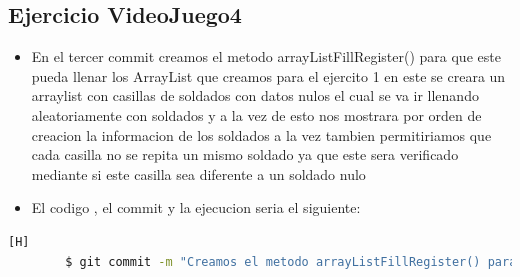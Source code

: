 \documentclass{article}
\begin{document}
	\subsection{Ejercicio VideoJuego4}
	\begin{itemize}	
		\item En el tercer commit creamos el metodo arrayListFillRegister() para que este pueda llenar los ArrayList que creamos para el ejercito 1 en este se creara un arraylist con casillas de soldados con datos nulos el cual se va ir llenando aleatoriamente con soldados y a la vez de esto nos mostrara por orden de creacion la informacion de los soldados a la vez tambien permitiriamos que cada casilla no se repita un mismo soldado ya que este sera verificado mediante si este casilla sea diferente a un soldado nulo
		\item El codigo , el commit y la ejecucion seria el siguiente:
	\end{itemize}	
	\begin{lstlisting}[language=bash,caption={Commit}][H]
		$ git commit -m "Creamos el metodo arrayListFillRegister() para que este pueda llenar los ArrayList que creamos para el ejercito 1 en este se creara un arraylist con casillas de soldados con datos nulos el cual se va ir llenando aleatoriamente con soldados y a la vez de esto nos mostrara por orden de creacion la informacion de los soldados a la vez tambien permitiriamos que cada casilla no se repita un mismo soldado ya que este sera verificado mediante si este casilla sea diferente a un soldado nulo"
	\end{lstlisting}	
\end{document}
